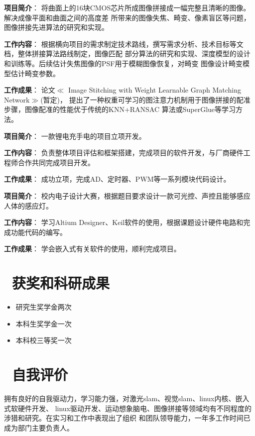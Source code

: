 \documentclass{resume}
\begin{document}
\textcolor[RGB]{80,100,190}{\textbf{项目简介}}：
将曲面上的16块CMOS芯片所成图像拼接成一幅完整且清晰的图像。解决成像平面和曲面之间的高度差
所带来的图像失焦、畸变、像素盲区等问题，图像拼接先进算法的研究和实现。

\textcolor[RGB]{80,100,190}{\textbf{工作内容}}：
根据横向项目的需求制定技术路线，撰写需求分析、技术目标等文档，整体拼接算法路线制定，图像匹配
部分算法的研究和实现、深度模型的设计和训练等。后续估计失焦图像的PSF用于模糊图像恢复，对畸变
图像设计畸变模型估计畸变参数。

\textcolor[RGB]{80,100,190}{\textbf{工作成果}}：
论文$\ll$ Image Stitching with Weight Learnable Graph Matching Network$\gg$(暂定)，
提出了一种权重可学习的图注意力机制用于图像拼接的配准步骤，图像配准的性能优于传统的KNN+RANSAC
算法或SuperGlue等学习方法。

\textcolor[RGB]{80,100,190}{\textbf{项目简介}}：
一款锂电充手电的项目立项开发。

\textcolor[RGB]{80,100,190}{\textbf{工作内容}}：
负责整体项目评估和框架搭建，完成项目的软件开发，与厂商硬件工程师合作共同完成项目开发。

\textcolor[RGB]{80,100,190}{\textbf{工作成果}}：
成功立项，完成AD、定时器、PWM等一系列模块代码设计。


\textcolor[RGB]{80,100,190}{\textbf{项目简介}}：
校内电子设计大赛，根据题目要求设计一款可光控、声控且能够感应人体的感应灯。

\textcolor[RGB]{80,100,190}{\textbf{工作内容}}：
学习Altium Designer、Keil软件的使用，根据课题设计硬件电路和完成功能代码的编写。

\textcolor[RGB]{80,100,190}{\textbf{工作成果}}：
学会嵌入式有关软件的使用，顺利完成项目。


\section{\textcolor[RGB]{50,50,190}{\faPaperPlane\ 获奖和科研成果}}
\begin{itemize}
  \item 研究生奖学金两次
  \item 本科生奖学金一次
  \item 本科校三等奖一次
\end{itemize}

\section{\textcolor[RGB]{50,50,190}{\faChild\ 自我评价}}
拥有良好的自我驱动力，学习能力强，对激光slam、视觉slam、linux内核、嵌入式软硬件开发、
linux驱动开发、运动想象脑电、图像拼接等领域均有不同程度的涉猎和研究。在实习和工作中表现出了组织
和团队领导能力，一年多工作时间已成为部门主要负责人。



%
%
\end{document}
